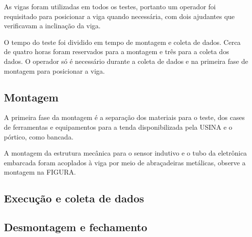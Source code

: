 As vigas foram utilizadas em todos os testes, portanto um operador foi
requisitado para posicionar a viga quando necessária, com dois ajudantes que
verificavam a inclinação da viga.

O tempo do teste foi dividido em tempo de montagem e coleta de dados. Cerca de
quatro horas foram reservados para a montagem e três para a coleta dos dados.
O operador só é necessário durante a coleta de dados e na primeira fase de
montagem para posicionar a viga.

\subsection{Montagem}
A primeira fase da montagem é a separação dos materiais para o teste, dos cases
de ferramentas e equipamentos para a tenda disponibilizada pela USINA e o
pórtico, como bancada.

A montagem da estrutura mecânica para o sensor indutivo e o tubo da
eletrônica embarcada foram acoplados à viga por meio de abraçadeiras metálicas,
observe a montagem na FIGURA.  

\subsection{Execução e coleta de dados}
\subsection{Desmontagem e fechamento}

\label{metodos}


